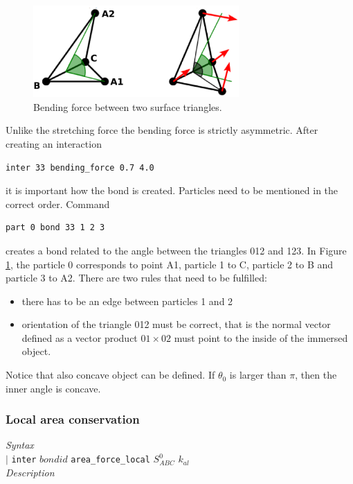 \documentclass[a4paper]{article}
\begin{document}
\begin{figure}[h]
   \centering
      \includegraphics[width=0.7\textwidth]{figures/bending.eps}
      \caption{Bending force between two surface triangles.}\label{fig:bending}
\end{figure}

Unlike the stretching force the bending force is strictly asymmetric. After creating an interaction
\begin{verbatim} 
inter 33 bending_force 0.7 4.0
\end{verbatim}
it is important how the bond is created. Particles need to be mentioned in the correct order. Command
\begin{verbatim} 
part 0 bond 33 1 2 3
\end{verbatim}
creates a bond related to the angle between the triangles 012 and 123. In Figure \ref{fig:bending}, the particle 0 corresponds to point A1, particle 1 to C, particle 2 to B and particle 3 to A2. There are two rules that need to be fulfilled:
\begin{itemize}
\item there has to be an edge between particles 1 and 2
\item orientation of the triangle 012 must be correct, that is the normal vector defined as a vector product $01 \times 02$ must point to the inside of the immersed object.
\end{itemize}
Notice that also concave object can be defined. If $\theta_0$ is larger than $\pi$, then the inner angle is concave.

\subsubsection{Local area conservation}
\textit{Syntax}\\
\hspace*{3mm} $\mid$ \texttt{inter} $bondid$ \texttt{area\_force\_local} $S_{ABC}^0$ $k_{al}$ \\
\newline
\textit{Description}\newline
\end{document}
